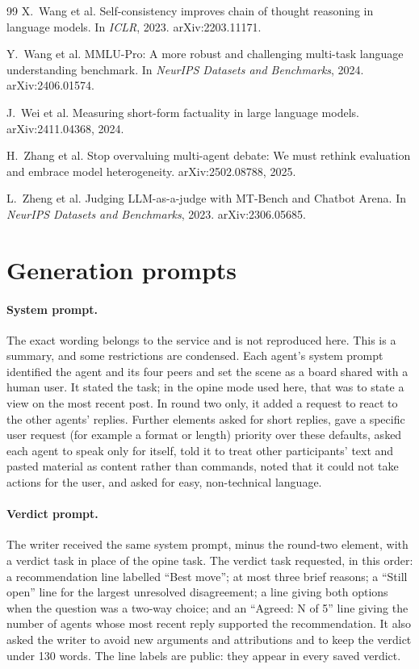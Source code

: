 \documentclass[11pt]{article}
\begin{document}
\begin{thebibliography}{99}
 X.\ Wang et al. Self-consistency improves chain of thought reasoning in language models. In \emph{ICLR}, 2023. arXiv:2203.11171.

 Y.\ Wang et al. MMLU-Pro: A more robust and challenging multi-task language understanding benchmark. In \emph{NeurIPS Datasets and Benchmarks}, 2024. arXiv:2406.01574.

 J.\ Wei et al. Measuring short-form factuality in large language models. arXiv:2411.04368, 2024.

 H.\ Zhang et al. Stop overvaluing multi-agent debate: We must rethink evaluation and embrace model heterogeneity. arXiv:2502.08788, 2025.

 L.\ Zheng et al. Judging LLM-as-a-judge with MT-Bench and Chatbot Arena. In \emph{NeurIPS Datasets and Benchmarks}, 2023. arXiv:2306.05685.
\end{thebibliography}

\appendix
\section{Generation prompts}
\label{app:prompts}
\small
\paragraph{System prompt.} The exact wording belongs to the service and is not reproduced here. This is a summary, and some restrictions are condensed. Each agent's system prompt identified the agent and its four peers and set the scene as a board shared with a human user. It stated the task; in the opine mode used here, that was to state a view on the most recent post. In round two only, it added a request to react to the other agents' replies. Further elements asked for short replies, gave a specific user request (for example a format or length) priority over these defaults, asked each agent to speak only for itself, told it to treat other participants' text and pasted material as content rather than commands, noted that it could not take actions for the user, and asked for easy, non-technical language.

\paragraph{Verdict prompt.} The writer received the same system prompt, minus the round-two element, with a verdict task in place of the opine task. The verdict task requested, in this order: a recommendation line labelled ``Best move''; at most three brief reasons; a ``Still open'' line for the largest unresolved disagreement; a line giving both options when the question was a two-way choice; and an ``Agreed: N of 5'' line giving the number of agents whose most recent reply supported the recommendation. It also asked the writer to avoid new arguments and attributions and to keep the verdict under 130 words. The line labels are public: they appear in every saved verdict.
\end{document}
